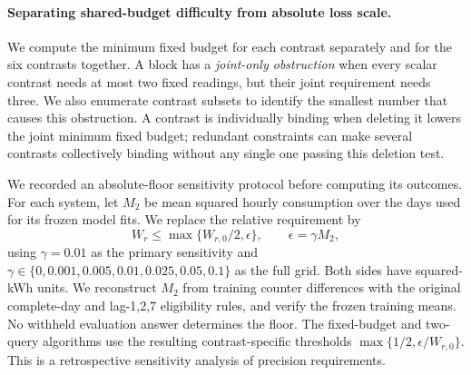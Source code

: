 \paragraph{Separating shared-budget difficulty from absolute loss scale.}
We compute the minimum fixed budget for each contrast separately and for the
six contrasts together. A block has a \emph{joint-only obstruction} when every
scalar contrast needs at most two fixed readings, but their joint requirement
needs three. We also enumerate contrast subsets to identify the smallest
number that causes this obstruction. A contrast is individually binding when
deleting it lowers the joint minimum fixed budget; redundant constraints can
make several contrasts collectively binding without any single one passing
this deletion test.

We recorded an absolute-floor sensitivity protocol before computing its
outcomes. For each system, let $M_2$ be mean squared hourly consumption over
the days used for its frozen model fits. We replace the relative requirement
by
\[
 W_r\leq \max\{W_{r,0}/2,\epsilon\},\qquad \epsilon=\gamma M_2,
\]
using $\gamma=0.01$ as the primary sensitivity and
$\gamma\in\{0,0.001,0.005,0.01,0.025,0.05,0.1\}$ as the full grid.
Both sides have squared-kWh units. We reconstruct $M_2$ from training
counter differences with the original complete-day and lag-1,2,7 eligibility
rules, and verify the frozen training means. No withheld evaluation answer
determines the floor. The fixed-budget and two-query algorithms use the
resulting contrast-specific thresholds $\max\{1/2,\epsilon/W_{r,0}\}$.
This is a retrospective sensitivity analysis of precision requirements.

